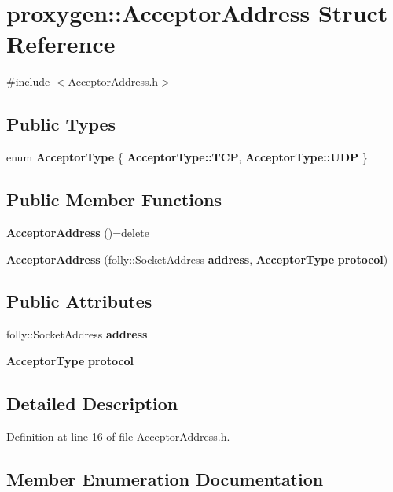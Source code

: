 \section{proxygen\+:\+:Acceptor\+Address Struct Reference}
\label{structproxygen_1_1AcceptorAddress}


{\ttfamily \#include $<$Acceptor\+Address.\+h$>$}

\subsection*{Public Types}
\begin{DoxyCompactItemize}
\item 
enum {\bf Acceptor\+Type} \{ {\bf Acceptor\+Type\+::\+T\+CP}, 
{\bf Acceptor\+Type\+::\+U\+DP}
 \}
\end{DoxyCompactItemize}
\subsection*{Public Member Functions}
\begin{DoxyCompactItemize}
\item 
{\bf Acceptor\+Address} ()=delete
\item 
{\bf Acceptor\+Address} (folly\+::\+Socket\+Address {\bf address}, {\bf Acceptor\+Type} {\bf protocol})
\end{DoxyCompactItemize}
\subsection*{Public Attributes}
\begin{DoxyCompactItemize}
\item 
folly\+::\+Socket\+Address {\bf address}
\item 
{\bf Acceptor\+Type} {\bf protocol}
\end{DoxyCompactItemize}


\subsection{Detailed Description}


Definition at line 16 of file Acceptor\+Address.\+h.



\subsection{Member Enumeration Documentation}
